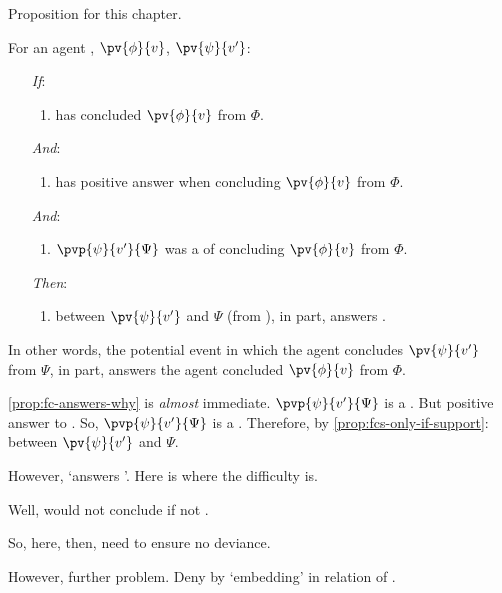 \begin{note}
  Proposition for this chapter.

  \begin{proposition}
    \label{prop:fc-answers-why}
    For an agent \vAgent{}, \(\pv{\phi}{v}\), \(\pv{\psi}{v'}\):

    \begin{enumerate}
    \item[\emph{If}:]
      \begin{enumerate}[label=\alph*., ref=(\alph*)]
      \item
        \vAgent{} has concluded \(\pv{\phi}{v}\) from \(\Phi\).
      \end{enumerate}
    \item[\emph{And}:]
      \begin{enumerate}[label=\alph*., ref=(\alph*), resume]
      \item
        \qzS{} has positive answer when concluding \(\pv{\phi}{v}\) from \(\Phi\).
      \end{enumerate}
    \item[\emph{And}:]
      \begin{enumerate}[label=\alph*., ref=(\alph*), resume]
      \item \(\pvp{\psi}{v'}{\Psi}\) was a \requ{} of concluding \(\pv{\phi}{v}\) from \(\Phi\).
      \end{enumerate}
    \item[\emph{Then}:]
      \begin{enumerate}[label=\alph*., ref=(\alph*), resume]
      \item {} between \(\pv{\psi}{v'}\) and \(\Psi\) (from ), in part, answers \qWhyV{}.
      \end{enumerate}
    \end{enumerate}
  \end{proposition}
  In other words, the potential event in which the agent concludes \(\pv{\psi}{v'}\) from \(\Psi\), in part, answers \qWhyV{} the agent concluded \(\pv{\phi}{v}\) from \(\Phi\).
\end{note}

\begin{note}
  \autoref{prop:fc-answers-why} is \emph{almost} immediate.
  \(\pvp{\psi}{v'}{\Psi}\) is a .
  But positive answer to \qzS{}.
  So, \(\pvp{\psi}{v'}{\Psi}\) is a .
  Therefore, by \autoref{prop:fcs-only-if-support}:
   between \(\pv{\psi}{v'}\) and \(\Psi\).

  However, `answers \qWhy{}'.
  Here is where the difficulty is.

  Well, would not conclude if not \fc{}.

  So, here, then, need to ensure no deviance.

  However, further problem.
  Deny by `embedding' in relation of \support{}.
\end{note}

